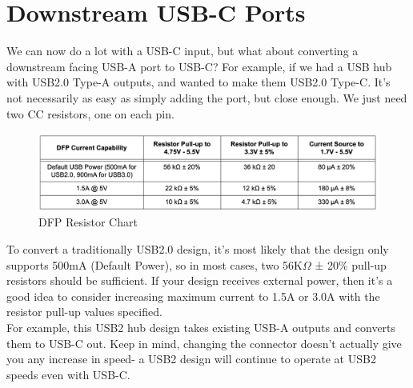 \documentclass[12pt]{article}
\begin{document}

\newpage

\section{Downstream USB-C Ports}

We can now do a lot with a USB-C input, but what about converting a downstream facing USB-A port to USB-C? For example, if we had a USB hub with USB2.0 Type-A outputs, and wanted to make them USB2.0 Type-C. It's not necessarily as easy as simply adding the port, but close enough. We just need two CC resistors, one on each pin. 

\begin{figure}[h]
	\centering
	\includegraphics[width=\linewidth]{images/microchip-dfp-table.png}
	\caption{DFP Resistor Chart\protect\footnotemark}
	\label{fig:microchip_dfp}
\end{figure}


\noindent
To convert a traditionally USB2.0 design, it's most likely that the design only supports 500mA (Default Power), so in most cases, two 56K$\Omega$  ± 20\% pull-up resistors should be sufficient. If your design receives external power, then it's a good idea to consider increasing maximum current to 1.5A or 3.0A with the resistor pull-up values specified. \\


\noindent
For example, this USB2 hub design takes existing USB-A outputs and converts them to USB-C out. Keep in mind, changing the connector doesn't actually give you any increase in speed- a USB2 design will continue to operate at USB2 speeds even with USB-C. 
\end{document}
